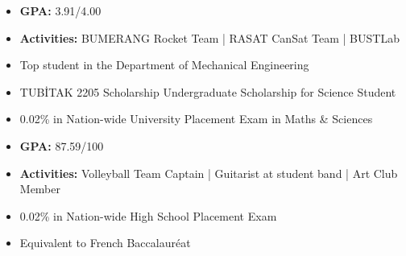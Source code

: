\documentclass[10pt,a4paper,ragged2e,withhyper]{altacv}
\begin{document}
\begin{paracol}{2}

        \switchcolumn

            \begin{itemize}
                \item \textbf{GPA:} 3.91/4.00
                \item \textbf{Activities:} BUMERANG Rocket Team | RASAT CanSat Team | BUSTLab
                \item Top student in the Department of Mechanical Engineering
                \item TUBİTAK 2205 Scholarship Undergraduate Scholarship for Science Student 
                \item 0.02\% in Nation-wide University Placement Exam in Maths \& Sciences 
            \end{itemize}
            \divider
            
            \begin{itemize}
                \item \textbf{GPA:} 87.59/100
                \item \textbf{Activities:} Volleyball Team Captain  |  Guitarist at student band  |  Art Club Member
                \item 0.02\% in Nation-wide High School Placement Exam
                \item Equivalent to French Baccalauréat
            \end{itemize}


\end{paracol}
\end{document}
